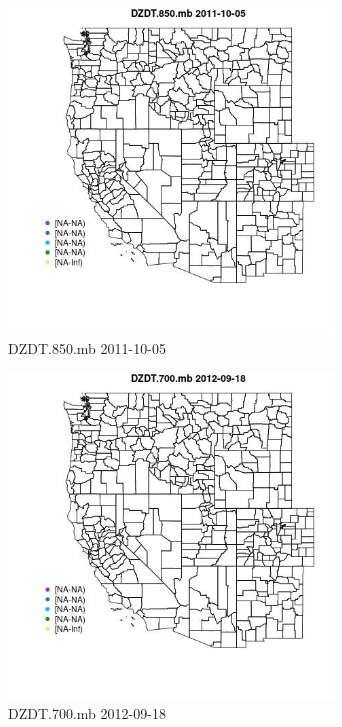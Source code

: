 \begin{figure} 
\centering  
\includegraphics[width=0.77\textwidth]{Code_Outputs/ML_input_report_ML_input_PM25_Step5_part_d_de_duplicated_aves_ML_input_MapObsDZDT850mb2011-10-05.jpg} 
\caption{\label{fig:ML_input_report_ML_input_PM25_Step5_part_d_de_duplicated_aves_ML_inputMapObsDZDT850mb2011-10-05}DZDT.850.mb 2011-10-05} 
\end{figure} 
 

\begin{figure} 
\centering  
\includegraphics[width=0.77\textwidth]{Code_Outputs/ML_input_report_ML_input_PM25_Step5_part_d_de_duplicated_aves_ML_input_MapObsDZDT700mb2012-09-18.jpg} 
\caption{\label{fig:ML_input_report_ML_input_PM25_Step5_part_d_de_duplicated_aves_ML_inputMapObsDZDT700mb2012-09-18}DZDT.700.mb 2012-09-18} 
\end{figure} 
 

